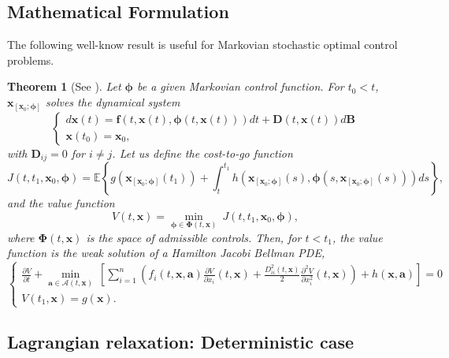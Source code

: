 \documentclass[ima, 20pt, portrait, plainboxedsections]{sciposter}
\newcommand{\E}{\mathbb{E}}
\newtheorem{Thm}{Theorem}
\begin{document}
\begin{multicols}{3}
\section*{Mathematical Formulation}
The following well-know result is useful for Markovian stochastic optimal control problems.
\begin{Thm}[See \cite{fleming2006controlled}] \label{T1}
Let  $\bm{\phi}$ be a given Markovian control function. For   $t_0<t$,  $\bm{x}_{[\bm{x}_0;\bm{\phi}]} $ solves the dynamical system
\begin{equation*}
\begin{cases}d\bm{x}(t) = \bm{f}(t,\bm{x}(t),\bm{\phi}(t,\bm{x}(t)))dt+\bm{D}(t,\bm{x}(t))d\bm{B}\\
\bm{x}(t_0)=\bm{x}_0,
\end{cases}
\end{equation*}
with $\bm{D}_{ij}=0$ for $i\neq j$. Let us define the cost-to-go function
\begin{equation*}
J(t, t_1,\bm{x}_0,\bm{\phi})=\E\left\{g\left(\bm{x}_{[\bm{x}_0;\bm{\phi}]}(t_1)\right)+\int_{t}^{t_1}h(\bm{x}_{[\bm{x}_0;\bm{\phi}]}(s),\bm{\phi}(s,\bm{x}_{[\bm{x}_0;\bm{\phi}]}(s)))ds\right\},
\end{equation*}
and the value function
\begin{equation*}
V(t,\bm{x})=\min_{\bm{\phi}\in\bm{\Phi}(t,\bm{x})}\ J(t,t_1,\bm{x}_0,\bm{\phi}),
\end{equation*}
where $\bm{\Phi}(t,\bm{x})$ is the space of admissible controls. Then, for $t<t_1$, the value function is the weak solution of a Hamilton Jacobi Bellman PDE,
\begin{equation*}
\begin{cases}
\frac{\partial V}{\partial t}+\min_{\bm{a}\in \mathcal{A}(t,\bm{x})}\ \left[\sum_{i=1}^n\left(f_i(t,\bm{x},\bm{a})\frac{\partial V}{\partial x_i}(t,\bm{x})+\frac{D_{ii}^2(t,\bm{x})}{2}\frac{\partial^2V}{\partial x_i^2}(t,\bm{x})\right)+h(\bm{x},\bm{a})\right]=0\\
V(t_1,\bm{x})=g(\bm{x}).
\end{cases}
\end{equation*}
\end{Thm}

\subsection*{Lagrangian relaxation: Deterministic case}


\end{multicols}
\end{document}
